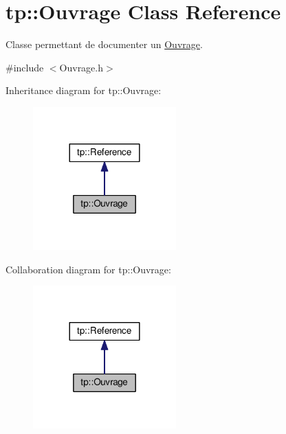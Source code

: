 \hypertarget{classtp_1_1Ouvrage}{}\section{tp\+:\+:Ouvrage Class Reference}
\label{classtp_1_1Ouvrage}


Classe permettant de documenter un \hyperlink{classtp_1_1Ouvrage}{Ouvrage}.  




{\ttfamily \#include $<$Ouvrage.\+h$>$}



Inheritance diagram for tp\+:\+:Ouvrage\+:\nopagebreak
\begin{figure}[H]
\begin{center}
\leavevmode
\includegraphics[width=156pt]{classtp_1_1Ouvrage__inherit__graph}
\end{center}
\end{figure}


Collaboration diagram for tp\+:\+:Ouvrage\+:\nopagebreak
\begin{figure}[H]
\begin{center}
\leavevmode
\includegraphics[width=156pt]{classtp_1_1Ouvrage__coll__graph}
\end{center}
\end{figure}
